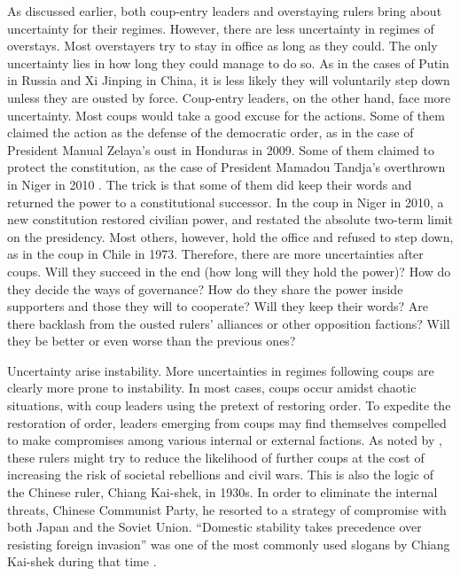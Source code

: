 \documentclass[
  12pt,
  a4paper,
  12pt]{article}
\begin{document}
As discussed earlier, both coup-entry leaders and overstaying rulers
bring about uncertainty for their regimes. However, there are less
uncertainty in regimes of overstays. Most overstayers try to stay in
office as long as they could. The only uncertainty lies in how long they
could manage to do so. As in the cases of Putin in Russia and Xi Jinping
in China, it is less likely they will voluntarily step down unless they
are ousted by force. Coup-entry leaders, on the other hand, face more
uncertainty. Most coups would take a good excuse for the actions. Some
of them claimed the action as the defense of the democratic order, as in
the case of President Manual Zelaya's oust in Honduras in 2009. Some of
them claimed to protect the constitution, as the case of President
Mamadou Tandja's overthrown in Niger in 2010 \citep{ginsburg2019}. The
trick is that some of them did keep their words and returned the power
to a constitutional successor. In the coup in Niger in 2010, a new
constitution restored civilian power, and restated the absolute two-term
limit on the presidency. Most others, however, hold the office and
refused to step down, as in the coup in Chile in 1973. Therefore, there
are more uncertainties after coups. Will they succeed in the end (how
long will they hold the power)? How do they decide the ways of
governance? How do they share the power inside supporters and those they
will to cooperate? Will they keep their words? Are there backlash from
the ousted rulers' alliances or other opposition factions? Will they be
better or even worse than the previous ones?

Uncertainty arise instability. More uncertainties in regimes following
coups are clearly more prone to instability. In most cases, coups occur
amidst chaotic situations, with coup leaders using the pretext of
restoring order. To expedite the restoration of order, leaders emerging
from coups may find themselves compelled to make compromises among
various internal or external factions. As noted by \citet{roessler2011},
these rulers might try to reduce the likelihood of further coups at the
cost of increasing the risk of societal rebellions and civil wars. This
is also the logic of the Chinese ruler, Chiang Kai-shek, in 1930s. In
order to eliminate the internal threats, Chinese Communist Party, he
resorted to a strategy of compromise with both Japan and the Soviet
Union. ``Domestic stability takes precedence over resisting foreign
invasion'' was one of the most commonly used slogans by Chiang Kai-shek
during that time \citet{chu1999chiang}.
\end{document}
